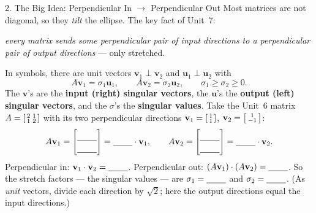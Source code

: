 \documentclass[10pt]{article}
\newcommand{\uu}{\mathbf{u}}
\newcommand{\vv}{\mathbf{v}}
\begin{document}
\begin{notesbox}{2. The Big Idea: Perpendicular In $\to$ Perpendicular Out}
Most matrices are not diagonal, so they \emph{tilt} the ellipse. The key fact of Unit~7:
\begin{center}
\emph{every matrix sends some perpendicular pair of input directions to a perpendicular pair of
output directions} --- only stretched.
\end{center}
In symbols, there are unit vectors $\vv_1\perp\vv_2$ and $\uu_1\perp\uu_2$ with
\[
  A\vv_1=\sigma_1\uu_1,\qquad A\vv_2=\sigma_2\uu_2,\qquad \sigma_1\ge\sigma_2\ge0.
\]
The $\vv$'s are the \textbf{input (right) singular vectors}, the $\uu$'s the \textbf{output (left)
singular vectors}, and the $\sigma$'s the \textbf{singular values}. Take the Unit~6 matrix
$A=\begin{bsmallmatrix} 2 & 1\\ 1 & 2 \end{bsmallmatrix}$ with its two perpendicular directions
$\vv_1=\begin{bsmallmatrix} 1\\ 1 \end{bsmallmatrix}$, $\vv_2=\begin{bsmallmatrix} 1\\ -1 \end{bsmallmatrix}$:
\[
  A\vv_1=\begin{bmatrix}\rule{0pt}{1.1em}\blank{0.8cm}\\[2pt]\blank{0.8cm}\end{bmatrix}
  =\blank{0.8cm}\cdot\vv_1,\qquad
  A\vv_2=\begin{bmatrix}\rule{0pt}{1.1em}\blank{0.8cm}\\[2pt]\blank{0.8cm}\end{bmatrix}
  =\blank{0.8cm}\cdot\vv_2.
\]
Perpendicular in: $\vv_1\cdot\vv_2=\blank{0.8cm}$. \; Perpendicular out:
$(A\vv_1)\cdot(A\vv_2)=\blank{0.8cm}$. \; So the stretch factors --- the singular values --- are
$\sigma_1=\blank{0.8cm}$ and $\sigma_2=\blank{0.8cm}$. (As \emph{unit} vectors, divide each direction
by $\sqrt2$; here the output directions equal the input directions.)


\end{notesbox}
\end{document}
